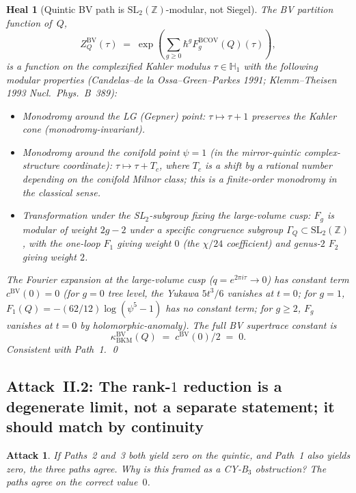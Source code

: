 \documentclass[11pt]{amsart}
\newtheorem{attack}[theorem]{Attack}
\newtheorem{heal}[theorem]{Heal}
\providecommand{\Z}{\mathbb{Z}}
\providecommand{\SL}{\mathrm{SL}}
\providecommand{\BV}{\mathrm{BV}}
\providecommand{\kBKM}{\kappa_{\mathrm{BKM}}}
\begin{document}
\begin{heal}[Quintic BV path is $\SL_2(\Z)$-modular, not Siegel]
\label{heal:bv-quintic-sl2}
The BV partition function of~$Q$,
\[
Z^{\BV}_Q(\tau) \;=\; \exp\left(\sum_{g \geq 0} \hbar^g
F_g^{\mathrm{BCOV}}(Q)(\tau)\right),
\]
is a function on the complexified Kahler modulus
$\tau \in \mathbb{H}_1$ with the following modular properties
(Candelas--de la Ossa--Green--Parkes 1991; Klemm--Theisen 1993
\textit{Nucl.\ Phys.\ B}~389):
\begin{itemize}
\item Monodromy around the LG (Gepner) point: $\tau \mapsto \tau + 1$
preserves the Kahler cone (monodromy-invariant).
\item Monodromy around the conifold point $\psi = 1$ (in the
mirror-quintic complex-structure coordinate): $\tau \mapsto \tau + T_c$,
where $T_c$ is a shift by a rational number depending on the
conifold Milnor class; this is a finite-order monodromy in the
classical sense.
\item Transformation under the SL$_2$-subgroup fixing the
large-volume cusp: $F_g$ is modular of weight $2g - 2$ under a
specific congruence subgroup $\Gamma_Q \subset \SL_2(\Z)$, with
the one-loop $F_1$ giving weight $0$ (the $\chi/24$ coefficient)
and genus-$2$ $F_2$ giving weight $2$.
\end{itemize}
The Fourier expansion at the large-volume cusp
($q = e^{2\pi i \tau} \to 0$) has constant term
$c^{\BV}(0) = 0$ (for $g = 0$ tree level, the Yukawa $5t^3/6$
vanishes at $t = 0$; for $g = 1$, $F_1(Q) = -(62/12)\log(\psi^5 - 1)$
has no constant term; for $g \geq 2$, $F_g$ vanishes at $t = 0$
by holomorphic-anomaly). The full BV supertrace constant is
\[
\kBKM^{\BV}(Q) \;=\; c^{\BV}(0) / 2 \;=\; 0.
\]
Consistent with Path~1.
\qed
\end{heal}

\subsection{Attack~II.2: The rank-$1$ reduction is a degenerate
limit, not a separate statement; it should match by continuity}

\begin{attack}
\label{att:rank-1-continuity}
If Paths~2 and~3 both yield zero on the quintic, and Path~1 also
yields zero, the three paths agree. Why is this framed as a
CY-B$_3$ obstruction? The paths agree on the correct value~$0$.
\end{attack}
\end{document}
